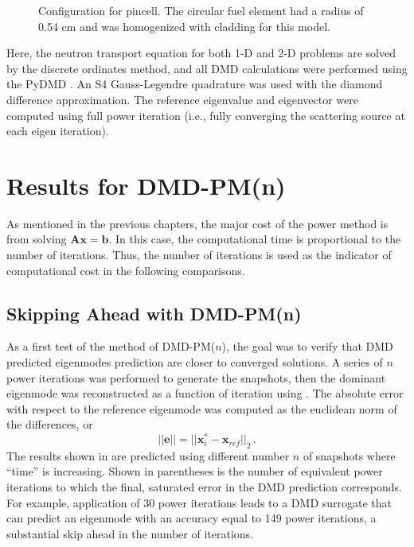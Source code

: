\begin{figure}[htb]
    \centering
    \caption{Configuration for pincell.  The circular fuel element had a 
             radius of 0.54 cm and was homogenized with cladding for this 
             model.}
    \label{fig:pin_cell_config}
\end{figure}
Here, the neutron transport equation for both 1-D and 2-D problems are solved by the discrete ordinates method, and all DMD calculations were performed using the PyDMD \cite{pydmd}.
An S4 Gauss-Legendre quadrature was used with the diamond difference approximation.
The reference eigenvalue and eigenvector were computed using full power iteration (i.e., fully converging the scattering source at each eigen iteration).

\section{Results for DMD-PM(n)}
As mentioned in the previous chapters, the major cost of the power method is from solving $\mathbf{Ax =b}$.
In this case, the computational time is proportional to the number of iterations.
Thus, the number of iterations is used as the indicator of computational cost in the following comparisons.

\subsection{Skipping Ahead with DMD-PM(n)}
As a first test of the method of DMD-PM($n$), the goal was to verify that DMD predicted eigenmodes prediction are closer to converged solutions.
A series of $n$ power iterations was performed to generate the snapshots, then the dominant eigenmode
was reconstructed as a function of iteration using .
The absolute error with respect to the reference eigenmode was computed as the euclidean norm of the differences, or
\begin{equation}
 ||\mathbf{e}|| =  ||\mathbf{x}^{*}_i-\mathbf{x}_{ref}||_2   \, .
 \label{eq:error}
\end{equation}
The results shown in  are predicted using different number $n$ of snapshots where ``time'' is increasing.
Shown in parentheses is the number of equivalent power iterations to which the final, saturated error in the DMD prediction corresponds.
For example, application of 30 power iterations leads to a DMD surrogate that can predict an eigenmode with an accuracy equal to 149 power iterations, a substantial skip ahead in the number of iterations.

